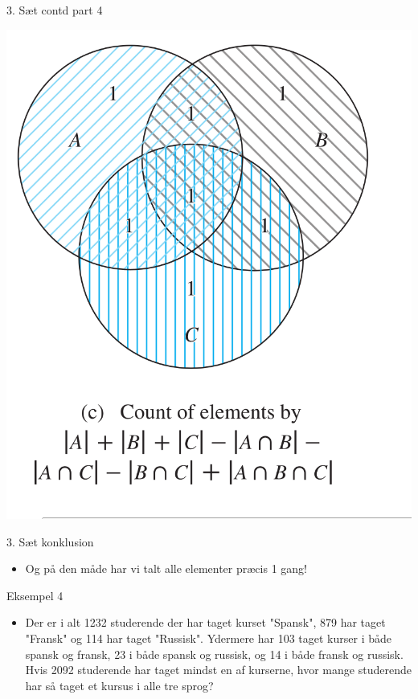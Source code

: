 \documentclass{beamer}
\begin{document}
\begin{frame}{3. Sæt contd part 4}
\begin{center}
    
   \includegraphics[scale=0.3]{81fig3c.png} 
\end{center}
\end{frame}
\begin{frame}{3. Sæt konklusion}
   \begin{itemize}
       \item Og på den måde har vi talt alle elementer præcis 1 gang!
   \end{itemize} 
\end{frame}

\begin{frame}[allowframebreaks]{Eksempel 4}
   \begin{itemize}
       \item Der er i alt 1232 studerende der har taget kurset "Spansk", 879 har taget "Fransk" og 114 har taget "Russisk". Ydermere har 103 taget kurser i både spansk og fransk, 23 i både spansk og russisk, og 14 i både fransk og russisk. Hvis 2092 studerende har taget mindst en af kurserne, hvor mange studerende har så taget et kursus i alle tre sprog? 
   \end{itemize} 
   
\end{frame}
\end{document}
